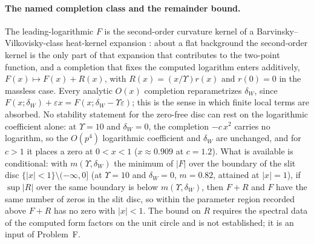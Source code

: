 \paragraph{The named completion class and the remainder bound.}
The leading-logarithmic \(F\) is the second-order curvature kernel
of a Barvinsky--Vilkovisky-class heat-kernel expansion
\cite{BarvinskyVilkovisky1990}: about a flat background the
second-order kernel is the only part of that expansion that
contributes to the two-point function, and a completion that fixes
the computed logarithm enters additively,
\(F(x)\mapsto F(x)+R(x)\), with \(R(x)=(x/\Upsilon)r(x)\) and
\(r(0)=0\) in the massless case. Every analytic \(O(x)\) completion
reparametrizes \(\delta_W\), since
\(F(x;\delta_W)+\varepsilon x=F(x;\delta_W-\Upsilon\varepsilon)\);
this is the sense in which finite local terms are absorbed. No
stability statement for the zero-free disc can rest on the
logarithmic coefficient alone: at \(\Upsilon=10\) and
\(\delta_W=0\), the completion \(-c\,x^{2}\) carries no logarithm,
so the \(O(p^4)\) logarithmic coefficient and \(\delta_W\) are
unchanged, and for \(c>1\) it places a zero at \(0<x<1\)
(\(x\approx0.909\) at \(c=1.2\)). What is available is
conditional: with \(m(\Upsilon,\delta_W)\) the minimum of \(|F|\)
over the boundary of the slit disc
\(\{|x|<1\}\setminus(-\infty,0]\) (at \(\Upsilon=10\) and
\(\delta_W=0\), \(m=0.82\), attained at \(|x|=1\)), if
\(\sup|R|\) over the same boundary is below
\(m(\Upsilon,\delta_W)\), then \(F+R\) and \(F\) have the same
number of zeros in the slit disc, so within the parameter region
recorded above \(F+R\) has no zero with \(|x|<1\). The bound on
\(R\) requires the spectral data of the computed form factors on
the unit circle and is not established; it is an input of
Problem~F.
